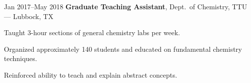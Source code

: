 \documentclass{resume}
\begin{document}
        \begin{twocolentry}{Jan 2017--May 2018}
            \textbf{Graduate Teaching Assistant}, Dept.\ of Chemistry, TTU --- Lubbock, TX
        \end{twocolentry}
        \vspace{0.10cm}
        \begin{onecolentry}
            \begin{highlights}
                \item Taught 3-hour sections of general chemistry labs per week.
                \item Organized approximately 140 students and educated on fundamental chemistry techniques.
                \item Reinforced ability to teach and explain abstract concepts.
            \end{highlights}
        \end{onecolentry}
\end{document}
